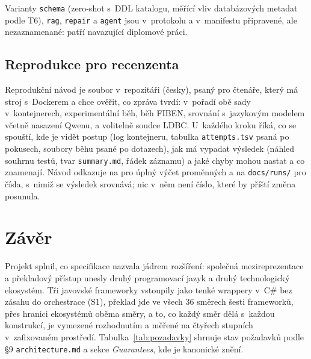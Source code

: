 \documentclass{article}
\begin{document}
Varianty \texttt{schema} (zero-shot s~DDL katalogu, měřící vliv databázových metadat podle T6), \texttt{rag}, \texttt{repair} a \texttt{agent} jsou v~protokolu a v~manifestu připravené, ale nezaznamenané: patří navazující diplomové práci.

\subsection{Reprodukce pro recenzenta}\label{sec:reprodukce}

Reprodukční návod je soubor  v~repozitáři (česky), psaný pro čtenáře, který má stroj s~Dockerem a chce ověřit, co zpráva tvrdí: v~pořadí obě sady v~kontejnerech, experimentální běh, běh FIBEN, srovnání s~jazykovým modelem včetně nasazení Qwenu, a volitelně soudce LDBC. U~každého kroku říká, co se spouští, kde je vidět postup (log kontejneru, tabulka \texttt{attempts.tsv} psaná po pokusech, soubory běhu psané po dotazech), jak má vypadat výsledek (náhled souhrnu testů, tvar \texttt{summary.md}, řádek záznamu) a jaké chyby mohou nastat a co znamenají. Návod odkazuje na  pro úplný výčet proměnných a na \texttt{docs/runs/} pro čísla, s~nimiž se výsledek srovnává; nic v~něm není číslo, které by příští změna posunula.
\section{Závěr}\label{sec:zaver}

Projekt splnil, co specifikace nazvala jádrem rozšíření: společná mezireprezentace a překladový přístup unesly druhý programovací jazyk a druhý technologický ekosystém. Tři javovské frameworky vstoupily jako tenké wrappery v~C\# bez zásahu do orchestrace (S1), překlad jde ve všech 36 směrech šesti frameworků, přes hranici ekosystémů oběma směry, a to, co každý směr dělá s~každou konstrukcí, je vymezené rozhodnutím a měřené na čtyřech stupních v~zafixovaném prostředí. Tabulka~\ref{tab:pozadavky} shrnuje stav požadavků podle §9 \texttt{architecture.md} a sekce \emph{Guarantees}, kde je kanonické znění.
\end{document}
